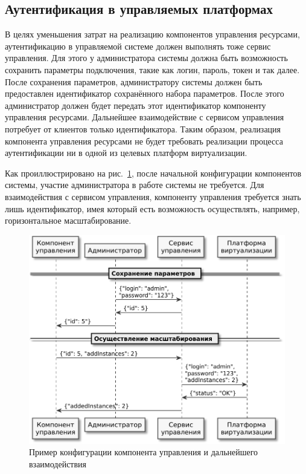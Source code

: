 \subsection{Аутентификация в управляемых платформах}
В целях уменьшения затрат на реализацию компонентов управления ресурсами, аутентификацию в управляемой системе должен выполнять тоже сервис управления.
Для этого у администратора системы должна быть возможность сохранить параметры подключения, такие как логин, пароль, токен и так далее. 
После сохранения параметров, администратору системы должен быть предоставлен идентификатор сохранённого набора параметров.
После этого администратор должен будет передать этот идентификатор компоненту управления ресурсами.
Дальнейшее взаимодействие с сервисом управления потребует от клиентов только идентификатора.
Таким образом, реализация компонента управления ресурсами не будет требовать реализации процесса аутентификации ни в одной из целевых платформ виртуализации.

Как проиллюстрировано на рис.~\ref{saving}, после начальной конфигурации компонентов системы, участие администратора в работе системы не требуется.
Для взаимодействия с сервисом управления, компоненту управления требуется знать лишь идентификатор, имея который есть возможность осуществлять, например, горизонтальное масштабирование.

\begin{figure}[hbtp]
    \centering
    \includegraphics[width=\textwidth]{img/saving.pdf}
    \caption{Пример конфигурации компонента управления и дальнейшего взаимодействия}
    \label{saving}
\end{figure}
